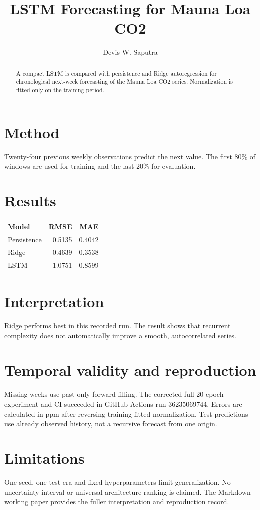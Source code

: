 \documentclass{article}
\title{LSTM Forecasting for Mauna Loa CO2}
\author{Devis W. Saputra}
\date{}
\begin{document}
\maketitle
\begin{abstract}
A compact LSTM is compared with persistence and Ridge autoregression for chronological next-week forecasting of the Mauna Loa CO2 series. Normalization is fitted only on the training period.
\end{abstract}
\section{Method}
Twenty-four previous weekly observations predict the next value. The first 80\% of windows are used for training and the last 20\% for evaluation.
\section{Results}
\begin{tabular}{lrr}
\toprule
Model & RMSE & MAE \\
\midrule
Persistence & 0.5135 & 0.4042 \\
Ridge & 0.4639 & 0.3538 \\
LSTM & 1.0751 & 0.8599 \\
\bottomrule
\end{tabular}
\section{Interpretation}
Ridge performs best in this recorded run. The result shows that recurrent complexity does not automatically improve a smooth, autocorrelated series.
\section{Temporal validity and reproduction}
Missing weeks use past-only forward filling. The corrected full 20-epoch experiment and CI succeeded in GitHub Actions run 36235069744. Errors are calculated in ppm after reversing training-fitted normalization. Test predictions use already observed history, not a recursive forecast from one origin.
\section{Limitations}
One seed, one test era and fixed hyperparameters limit generalization. No uncertainty interval or universal architecture ranking is claimed. The Markdown working paper provides the fuller interpretation and reproduction record.
\end{document}
